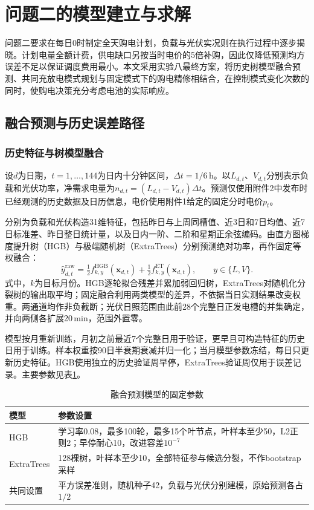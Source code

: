 \section{问题二的模型建立与求解}
\label{sec:q2-prediction}

问题二要求在每日0时制定全天购电计划，负载与光伏实况则在执行过程中逐步揭晓。计划电量全额计费，供电缺口另按当时电价的5倍补购，因此仅降低预测均方误差不足以保证调度费用最小。本文采用实验八最终方案，将历史树模型融合预测、共同充放电模式规划与固定模式下的购电精修相结合，在控制模式变化次数的同时，使购电决策充分考虑电池的实际响应。

\subsection{融合预测与历史误差路径}
\subsubsection{历史特征与树模型融合}

设$d$为日期，$t=1,\ldots,144$为日内十分钟区间，$\Delta t=1/6$\,h。以$L_{d,t}$、$V_{d,t}$分别表示负载和光伏功率，净需求电量为$n_{d,t}=(L_{d,t}-V_{d,t})\Delta t$。预测仅使用附件2中发布时已经观测的历史数据及日历信息，电价使用附件1给定的固定分时电价$p_t$。

分别为负载和光伏构造31维特征，包括昨日与上周同槽值、近3日和7日均值、近7日标准差、昨日整日统计量，以及日内一阶、二阶和星期正余弦编码。由直方图梯度提升树（HGB）与极端随机树（ExtraTrees）分别预测绝对功率，再作固定等权融合：
\begin{equation}\label{eq:q2-blend}
 \widehat y^{\mathrm{raw}}_{d,t}
 =\tfrac12 f^{\mathrm{HGB}}_{k,y}(\mathbf x_{d,t})
 +\tfrac12 f^{\mathrm{ET}}_{k,y}(\mathbf x_{d,t}),\qquad y\in\{L,V\}.
\end{equation}
式中，$k$为目标月份。HGB逐轮拟合残差并累加弱回归树，ExtraTrees对随机化分裂树的输出取平均；固定融合利用两类模型的差异，不依据当日实测结果改变权重。两通道均作非负截断；光伏日照范围由此前28个完整日正发电槽的并集确定，并向两侧各扩展20\,min，范围外置零。

模型按月重新训练，月初之前最近7个完整日用于验证，更早且可构造特征的历史日用于训练。样本权重按90日半衰期衰减并归一化；当月模型参数冻结，每日只更新历史特征。HGB使用独立的历史验证周早停，ExtraTrees验证周仅用于误差记录。主要参数见表\ref{tab:q2-forecast-setup}。
\begin{table}[htbp]
\centering\small
\caption{融合预测模型的固定参数}\label{tab:q2-forecast-setup}
\begin{tabularx}{\textwidth}{p{2.2cm}X}
\toprule 模型 & 参数设置\\\midrule
HGB & 学习率0.08，最多100轮，最多15个叶节点，叶样本至少50，L2正则2；早停耐心10，改进容差$10^{-7}$\\
ExtraTrees & 128棵树，叶样本至少10，全部特征参与候选分裂，不作bootstrap采样\\
共同设置 & 平方误差准则，随机种子42，负载与光伏分别建模，原始预测各占$1/2$\\
\bottomrule\end{tabularx}
\end{table}

